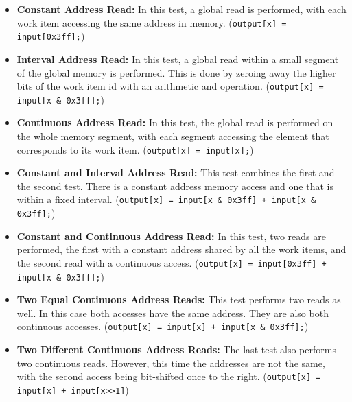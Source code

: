 \begin{itemize}
	\item \textbf{Constant Address Read:} In this test, a global read is performed, with each work item accessing the same address in memory. (\verb!output[x] = input[0x3ff];!)
	\item \textbf{Interval Address Read:} In this test, a global read within a small segment of the global memory is performed. This is done by zeroing away the higher bits of the work item id with an arithmetic and operation. (\verb!output[x] = input[x & 0x3ff];!)
	\item \textbf{Continuous Address Read:} In this test, the global read is performed on the whole memory segment, with each segment accessing the element that corresponds to its work item. (\verb!output[x] = input[x];!)
	\item \textbf{Constant and Interval Address Read:} This test combines the first and the second test. There is a constant address memory access and one that is within a fixed interval. (\verb!output[x] = input[x & 0x3ff] + input[x & 0x3ff];!)
	\item \textbf{Constant and Continuous Address Read:} In this test, two reads are performed, the first with a constant address shared by all the work items, and the second read with a continuous access. (\verb!output[x] = input[0x3ff] + input[x & 0x3ff];!)
	\item \textbf{Two Equal Continuous Address Reads:} This test performs two reads as well. In this case both accesses have the same address. They are also both continuous accesses. (\verb!output[x] = input[x] + input[x & 0x3ff];!)
	\item \textbf{Two Different Continuous Address Reads:} The last test also performs two continuous reads. However, this time the addresses are not the same, with the second access being bit-shifted once to the right. (\verb!output[x] = input[x] + input[x>>1]!) 
\end{itemize}


